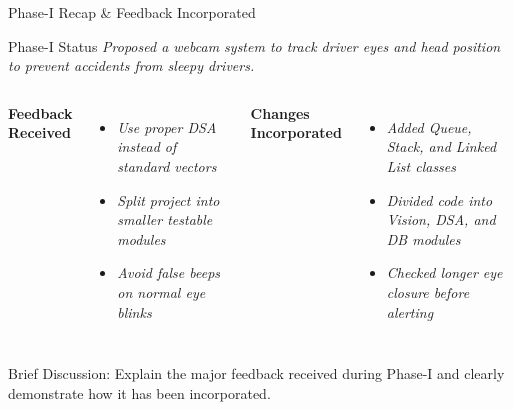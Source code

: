 \documentclass[aspectratio=169,11pt]{beamer}
\newcommand{\smallnote}[1]{%
\vspace{0.08cm}
{\scriptsize\color{GEUGrey}#1}
}
\newcommand{\placeholder}[1]{%
\textit{\color{GEUGrey}#1}
}
\begin{document}
\begin{frame}{Phase-I Recap \& Feedback Incorporated}

\begin{block}{Phase-I Status}
\placeholder{
Proposed a webcam system to track driver eyes and head position to prevent accidents from sleepy drivers.
}
\end{block}

\vspace{2mm}

\begin{columns}[T,totalwidth=\textwidth]


\textbf{\color{GEUBlue}Feedback Received}

\begin{itemize}\itemsep2pt
\item \placeholder{Use proper DSA instead of standard vectors}
\item \placeholder{Split project into smaller testable modules}
\item \placeholder{Avoid false beeps on normal eye blinks}
\end{itemize}


\textbf{\color{GEUBlue}Changes Incorporated}

\begin{itemize}\itemsep2pt
\item \placeholder{Added Queue, Stack, and Linked List classes}
\item \placeholder{Divided code into Vision, DSA, and DB modules}
\item \placeholder{Checked longer eye closure before alerting}
\end{itemize}

\end{columns}

\vfill

\smallnote{
Brief Discussion: Explain the major feedback received during Phase-I
and clearly demonstrate how it has been incorporated.
}

\end{frame}
\end{document}

